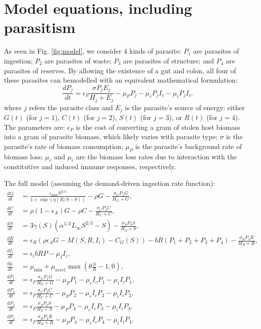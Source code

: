\documentclass[12pt,reqno,final,pdftex]{amsart}\usepackage[]{graphicx}\usepackage[]{color}
\theoremstyle{plain}
\numberwithin{equation}{part}
\begin{document}
\section*{Model equations, including parasitism}
As seen in Fig. \ref{fig:model}, we consider 4 kinds of parasite: $P_1$ are parasites of ingestion; $P_2$ are parasites of waste; $P_3$ are parasites of structure; and $P_4$ are parasites of reserves.
By allowing the existence of a gut and colon, all four of these parasites can bemodelled with an equivalent mathematical formulation:
\begin{equation}
\frac{dP_j}{dt} = \epsilon_P \frac{\sigma P_j E_j}{H_j+E_j}  - \mu_P P_j - \mu_c P_j I_c - \mu_i P_j I_i,
\end{equation}
where $j$ refers the parasite class and $E_j$ is the parasite's source of energy: either $G(t)$ (for $j=1$), $C(t)$ (for $j=2$), $S(t)$ (for $j=3$), or $R(t)$ (for $j=4$).
The parameters are: $\epsilon_P$ is the cost of converting a gram of stolen host biomass into a gram of parasite biomass, which likely varies with parasite type; $\sigma$ is the parasite's rate of biomass consumption; $\mu_P$ is the parasite's background rate of biomass loss; $\mu_c$ and $\mu_i$ are the biomass loss rates due to interaction with the constitutive and induced immune responses, respectively.

The full model (assuming the demand-driven ingestion rate function):
\begin{align}
\frac{dG}{dt} &= \frac{\iota_{\max}S^{2/3}}{1 + \exp\left(\eta(R/S-\theta)\right)} - \rho G - \frac{\sigma_G P_1 G}{H_G + G}, \\
\frac{dC}{dt} &= \rho (1-\epsilon_A)G - \rho C - \frac{\sigma_C P_2 C}{H_C + C}, \\
\frac{dS}{dt} &= 3\gamma(S) \left(\alpha^{1/3}L_{\infty }S^{2/3}-S\right) - \frac{\sigma_S P_3 S}{H_S + S}, \\
\frac{dR}{dt} &= \epsilon_R\left(\rho \epsilon_A G-M(S,R,I_i)-C_G(S)\right)-b R (P_1+P_2+P_3+P_4) - \frac{\sigma_R P_4 R}{H_R + R}, \\
\frac{dI_i}{dt} &= \epsilon_ib R P-\mu_II_i, \\
\frac{d\mu}{dt} &= \mu_{\min} + \mu_{accel}\max\left(\theta \frac{S}{R} - 1, 0\right), \\
\frac{dP_1}{dt} &= \epsilon_P \frac{\sigma_G P_1 G}{H_G + G} - \mu_P P_1 - \mu_c I_c P_1 - \mu_i I_i P_1, \\
\frac{dP_2}{dt} &= \epsilon_P \frac{\sigma_C P_2 C}{H_C + C} - \mu_P P_2 - \mu_c I_c P_2 - \mu_i I_i P_2, \\
\frac{dP_3}{dt} &= \epsilon_P \frac{\sigma_S P_3 S}{H_S + S} - \mu_P P_3 - \mu_c I_c P_3 - \mu_i I_i P_3, \\
\frac{dP_4}{dt} &= \epsilon_P \frac{\sigma_R P_4 R}{H_R + R} - \mu_P P_4 - \mu_c I_c P_4 - \mu_i I_i P_4.
\end{align}
\end{document}
